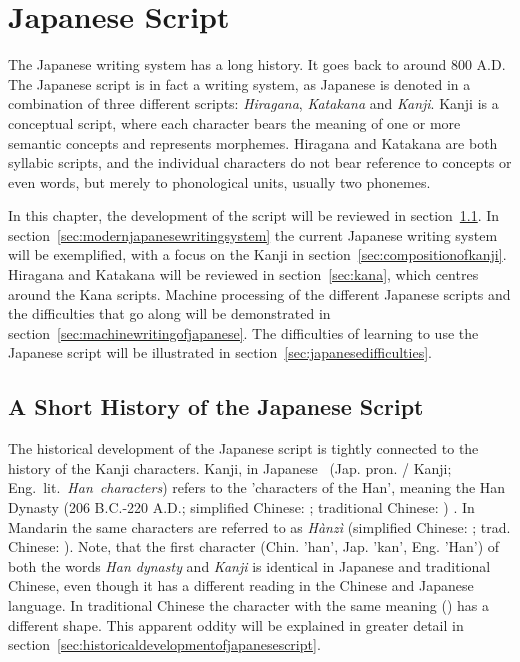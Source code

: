 
\chapter{Japanese Script}
\label{chap:japanasescript}

The Japanese writing system has a long history. It goes back to around 800 A.D. 
The Japanese script is in fact a writing system, as Japanese is denoted in 
a combination of three different scripts: \emph{Hiragana}, \emph{Katakana} and 
\emph{Kanji}. Kanji is a conceptual script, where each character bears the 
meaning of one or more semantic concepts and represents morphemes. 
Hiragana and Katakana are both syllabic scripts, and the individual characters do
not bear reference to concepts or even words, but merely to phonological units, 
usually two phonemes.

In this chapter, the development of the script will be reviewed in 
section~\ref{sec:ashorthistoryofjapanesewritingsystem}.
In section~\ref{sec:modernjapanesewritingsystem} the current Japanese writing 
system will be exemplified, with a focus on the Kanji in 
section~\ref{sec:compositionofkanji}. Hiragana and Katakana will be reviewed in
section~\ref{sec:kana}, which centres around the Kana scripts. 
Machine processing of the different Japanese scripts and the difficulties that
go along will be demonstrated in section~\ref{sec:machinewritingofjapanese}.
The difficulties of learning to use the Japanese script will be illustrated in 
section~\ref{sec:japanesedifficulties}.

\section{A Short History of the Japanese Script}
\label{sec:ashorthistoryofjapanesewritingsystem}

The historical development of the Japanese script is tightly connected to the 
history of the Kanji characters. Kanji, in Japanese 
~(Jap. pron.  / Kanji; Eng.~lit.~\emph{Han~characters}) 
refers to the 'characters of the Han', meaning the Han Dynasty 
(206 B.C.-220 A.D.; simplified Chinese: ; traditional Chinese: 
) . In Mandarin the same characters are 
referred to as \emph{Hànzì} (simplified Chinese: ; 
trad. Chinese: ).
Note, that the first character  (Chin. 'han', Jap. 'kan', Eng. 'Han') 
of both the words \emph{Han dynasty} and \emph{Kanji} is identical in Japanese 
and traditional Chinese, even though it has a different reading in the 
Chinese and Japanese language. In traditional Chinese the character with
the same meaning () has a different shape. This apparent oddity will be 
explained in greater detail in 
section~\ref{sec:historicaldevelopmentofjapanesescript}.

